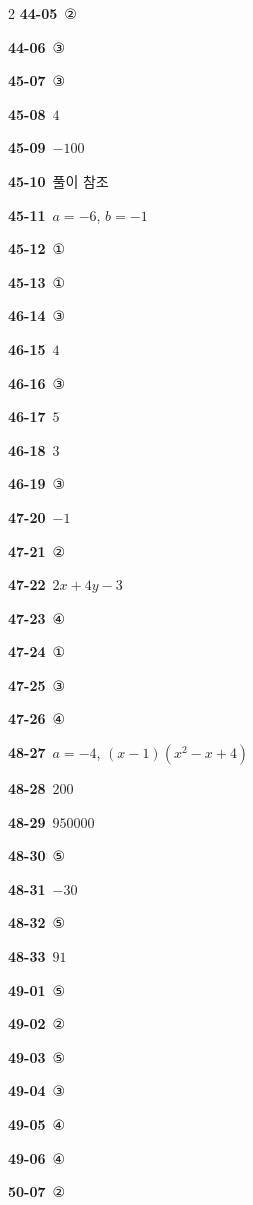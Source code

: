 \documentclass[10pt,a4paper]{article}
\begin{document}
\begin{multicols}{2}
\noindent\textbf{44-05}\ ②\par
\noindent\textbf{44-06}\ ③\par
\noindent\textbf{45-07}\ ③\par
\noindent\textbf{45-08}\ $4$\par
\noindent\textbf{45-09}\ $-100$\par
\noindent\textbf{45-10}\ 풀이 참조\par
\noindent\textbf{45-11}\ $a=-6$, $b=-1$\par
\noindent\textbf{45-12}\ ①\par
\noindent\textbf{45-13}\ ①\par
\noindent\textbf{46-14}\ ③\par
\noindent\textbf{46-15}\ $4$\par
\noindent\textbf{46-16}\ ③\par
\noindent\textbf{46-17}\ $5$\par
\noindent\textbf{46-18}\ $3$\par
\noindent\textbf{46-19}\ ③\par
\noindent\textbf{47-20}\ $-1$\par
\noindent\textbf{47-21}\ ②\par
\noindent\textbf{47-22}\ $2x+4y-3$\par
\noindent\textbf{47-23}\ ④\par
\noindent\textbf{47-24}\ ①\par
\noindent\textbf{47-25}\ ③\par
\noindent\textbf{47-26}\ ④\par
\noindent\textbf{48-27}\ $a=-4$, $(x-1)(x^2-x+4)$\par
\noindent\textbf{48-28}\ $200$\par
\noindent\textbf{48-29}\ $950000$\par
\noindent\textbf{48-30}\ ⑤\par
\noindent\textbf{48-31}\ $-30$\par
\noindent\textbf{48-32}\ ⑤\par
\noindent\textbf{48-33}\ $91$\par
\noindent\textbf{49-01}\ ⑤\par
\noindent\textbf{49-02}\ ②\par
\noindent\textbf{49-03}\ ⑤\par
\noindent\textbf{49-04}\ ③\par
\noindent\textbf{49-05}\ ④\par
\noindent\textbf{49-06}\ ④\par
\noindent\textbf{50-07}\ ②\par

\end{multicols}
\end{document}
